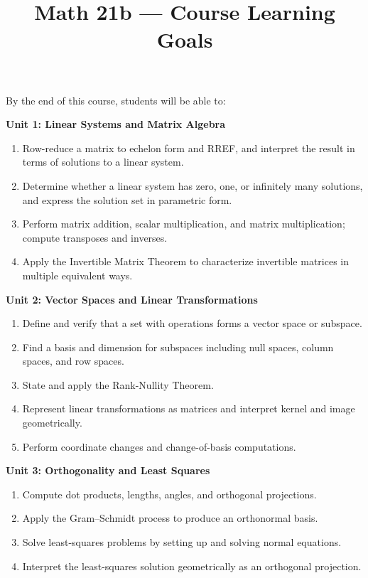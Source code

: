 \documentclass{amsart}
\title{Math 21b --- Course Learning Goals}
\date{}
\begin{document}
\maketitle

By the end of this course, students will be able to:

\bigskip

\textbf{Unit 1: Linear Systems and Matrix Algebra}
\begin{enumerate}[leftmargin=2em]
    \item Row-reduce a matrix to echelon form and RREF, and interpret the result in terms of solutions to a linear system.
    \item Determine whether a linear system has zero, one, or infinitely many solutions, and express the solution set in parametric form.
    \item Perform matrix addition, scalar multiplication, and matrix multiplication; compute transposes and inverses.
    \item Apply the Invertible Matrix Theorem to characterize invertible matrices in multiple equivalent ways.
\end{enumerate}

\bigskip

\textbf{Unit 2: Vector Spaces and Linear Transformations}
\begin{enumerate}[leftmargin=2em, resume]
    \item Define and verify that a set with operations forms a vector space or subspace.
    \item Find a basis and dimension for subspaces including null spaces, column spaces, and row spaces.
    \item State and apply the Rank-Nullity Theorem.
    \item Represent linear transformations as matrices and interpret kernel and image geometrically.
    \item Perform coordinate changes and change-of-basis computations.
\end{enumerate}

\bigskip

\textbf{Unit 3: Orthogonality and Least Squares}
\begin{enumerate}[leftmargin=2em, resume]
    \item Compute dot products, lengths, angles, and orthogonal projections.
    \item Apply the Gram--Schmidt process to produce an orthonormal basis.
    \item Solve least-squares problems by setting up and solving normal equations.
    \item Interpret the least-squares solution geometrically as an orthogonal projection.
\end{enumerate}
\end{document}
